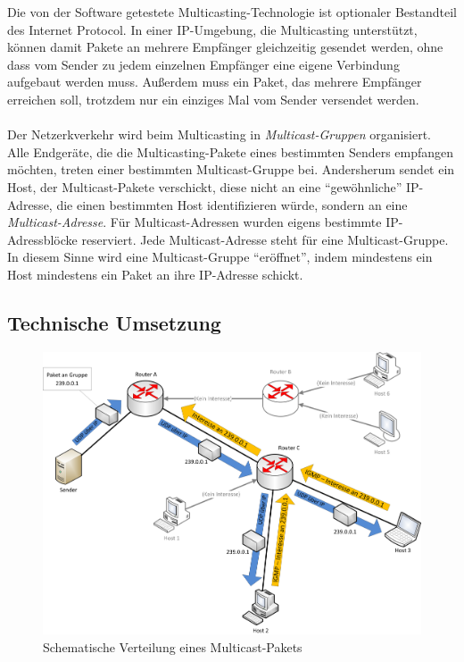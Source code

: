 Die von der Software getestete Multicasting-Technologie ist optionaler
Bestandteil des Internet Protocol. In einer IP-Umgebung, die Multicasting
unterstützt, können damit Pakete an mehrere Empfänger gleichzeitig gesendet
werden, ohne dass vom Sender zu jedem einzelnen Empfänger eine eigene Verbindung
aufgebaut werden muss. Außerdem muss ein Paket, das mehrere Empfänger erreichen
soll, trotzdem nur ein einziges Mal vom Sender versendet werden.\\
\\
Der Netzerkverkehr wird beim Multicasting in \emph{Multicast-Gruppen}
organisiert. Alle Endgeräte, die die Multicasting-Pakete eines bestimmten
Senders empfangen möchten, treten einer bestimmten Multicast-Gruppe bei.
Andersherum sendet ein Host, der Multicast-Pakete verschickt, diese nicht an
eine "`gewöhnliche"' IP-Adresse, die einen bestimmten Host identifizieren würde,
sondern an eine \emph{Multicast-Adresse}. Für Multicast-Adressen wurden eigens
bestimmte IP-Adressblöcke reserviert. Jede Multicast-Adresse steht für eine
Multicast-Gruppe. In diesem Sinne wird eine Multicast-Gruppe "`eröffnet"', indem
mindestens ein Host mindestens ein Paket an ihre IP-Adresse schickt.

\subsection{Technische Umsetzung}

\begin{figure}[H]
\includegraphics[width=15cm]{images/multicasting.png}
\centering
\caption{Schematische Verteilung eines Multicast-Pakets}
\label{mc_overview}
\end{figure}

